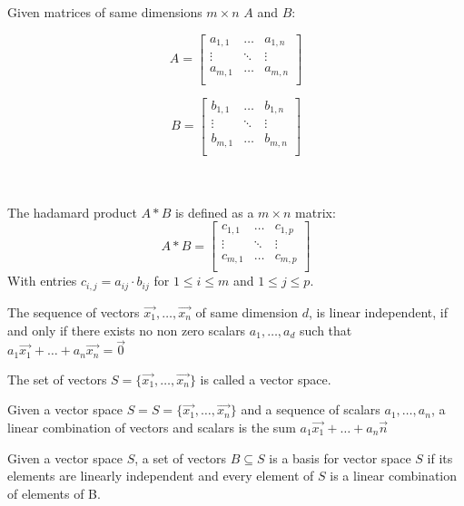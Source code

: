 \begin{mydef}
	Given matrices of same dimensions $m \times n$ $A$ and $B$:
	\begin{minipage}{0.4\linewidth}
		\begin{equation*}
			A = 
			\begin{bmatrix}
				a_{1 ,1} & \ldots & a_{1, n} \\
				\vdots & \ddots & \vdots \\
				a_{m ,1} & \ldots & a_{m, n} \\
			\end{bmatrix}
		\end{equation*}
	\end{minipage}	
	\begin{minipage}[b]{0.59\linewidth}
		\begin{equation*}
			B = 
			\begin{bmatrix}
				b_{1 ,1} & \ldots & b_{1, n} \\
				\vdots & \ddots & \vdots \\
				b_{m ,1} & \ldots & b_{m, n} \\
			\end{bmatrix}
		\end{equation*}
	\end{minipage}	
\\ \\
	The hadamard product $A*B$ is defined as a  $m \times n$ matrix:
	\begin{equation*}
	 A*B = 
	\begin{bmatrix}
		c_{1 ,1} & \ldots & c_{1, p} \\
		\vdots & \ddots & \vdots \\
		c_{m ,1} & \ldots & c_{m, p} \\
	\end{bmatrix}
	\end{equation*}
	With entries $c_{i,j} = a_{ij} \cdot b_{ij}$ for $1 \leq i \leq m$ and $1 \leq j \leq p$.
\end{mydef}
\begin{mydef}
	The sequence of vectors $\vec{x_1}, \ldots, \vec{x_n}$ of same dimension $d$, is linear independent, if and only if there exists no non zero scalars $a_1, \ldots, a_d$ such that $a_1\vec{x_1} + \ldots + a_n\vec{x_n} = \vec{0}$
\end{mydef}
\begin{mydef}
	The set of vectors $S = \{\vec{x_1}, \ldots, \vec{x_n}\}$ is called a vector space.
\end{mydef}
\begin{mydef}
	Given a vector space $S = S = \{\vec{x_1}, \ldots, \vec{x_n}\}$ and a sequence of scalars $a_1, \ldots, a_n$, a linear combination of vectors and scalars is the sum $a_1\vec{x_1} + \ldots + a_n\vec{n}$
\end{mydef}
\begin{mydef}
	Given a vector space $S$, a set of vectors $B \subseteq S$ is a basis for vector space $S$ if its elements are linearly independent and every element of $S$ is a linear combination of elements of B.
\end{mydef}


